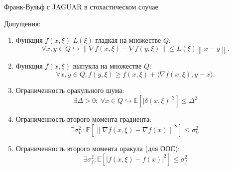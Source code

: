 \documentclass{beamer}
\newcommand{\expect}[1]{\mathbb{E}\left[ #1 \right]}
\newcommand{\norms}[1]{\left\| #1 \right\|}
\begin{document}
\begin{frame}{Франк-Вульф с JAGUAR в стохастическом случае}

    Допущения:
    \small{
        \begin{enumerate}
            \item Функция $f(x, \xi)$ $L(\xi)$-гладкая на множестве $Q$: 
                \begin{equation*}
                    \forall x, y \in Q \hookrightarrow \left\|\nabla f(x, \xi) - \nabla f(y, \xi)\right\| \leq L(\xi) \left\|x-y\right\|.
                \end{equation*}

            \item Функция $f(x, \xi)$ выпукла на множестве $Q$:
                \begin{equation*}
                    \forall x, y \in Q: f(y, \xi) \geq f(x, \xi) + \langle \nabla f(x, \xi), y - x \rangle.
                \end{equation*}

            \item Ограниченность оракульного шума:
                \begin{equation*}
                    \exists \Delta > 0 : ~\forall x \in Q \hookrightarrow \expect{|\delta(x, \xi)|^2} \leq \Delta^2
                \end{equation*}

            \item Ограниченность второго момента градиента:
                \begin{equation*}
                    \exists \sigma^2_{\nabla} : \expect{\norms{\nabla f(x, \xi) - \nabla f(x)}^2} \leq \sigma^2_{\nabla}
                \end{equation*}

            \item Ограниченность второго момента оракула (для ООС):
                \begin{equation*}
                    \exists \sigma^2_{f} : \expect{\left|f(x, \xi) - f(x) \right|^2} \leq \sigma^2_{f}
                \end{equation*}
            
        \end{enumerate}
        }

\end{frame}

\end{document}
